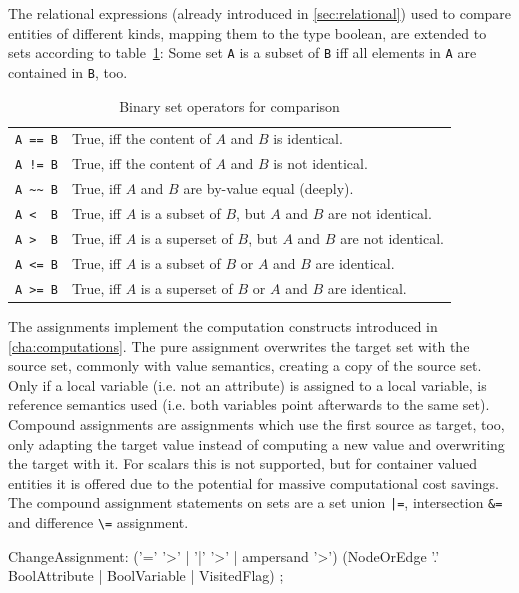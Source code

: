 The relational expressions (already introduced in \ref{sec:relational}) used to compare entities of different kinds, mapping them to the type boolean, are extended to sets according to table~\ref{compset}:
Some set \texttt{A} is a subset of \texttt{B} iff all elements in \texttt{A} are contained in \texttt{B}, too.

\begin{table}[htbp]
  \centering
  \begin{tabularx}{\linewidth}{|l|X|}
    \hline
    \texttt{A == B} & True, iff the content of $A$ and $B$ is identical. \\
    \texttt{A != B} & True, iff the content of $A$ and $B$ is not identical. \\
    \texttt{A \textasciitilde\textasciitilde\ B} & True, iff $A$ and $B$ are by-value equal (deeply).\\
    \texttt{A <\ \ B} & True, iff $A$ is a subset of $B$, but $A$ and $B$ are not identical. \\
    \texttt{A >\ \ B} & True, iff $A$ is a superset of $B$, but $A$ and $B$ are not identical. \\
    \texttt{A <= B} & True, iff $A$ is a subset of $B$ or $A$ and $B$ are identical. \\
    \texttt{A >= B} & True, iff $A$ is a superset of $B$ or $A$ and $B$ are identical. \\
    \hline
  \end{tabularx}
  \caption{Binary set operators for comparison}
  \label{compset}
\end{table}

The assignments implement the computation constructs introduced in \ref{cha:computations}.
The pure assignment overwrites the target set with the source set, commonly with value semantics, creating a copy of the source set. Only if a local variable (i.e. not an attribute) is assigned to a local variable, is reference semantics used (i.e. both variables point afterwards to the same set).
Compound assignments are assignments which use the first source as target, too,
only adapting the target value instead of computing a new value and overwriting the target with it.
For scalars this is not supported, but for container valued entities it is offered due to the potential for massive computational cost savings.
The compound assignment statements on sets are a set union \verb#|=#, intersection \verb#&=# and difference \verb#\=# assignment.

\begin{rail}
  ChangeAssignment: ('=' '>' | '|' '>' | ampersand '>') (NodeOrEdge '.' BoolAttribute | BoolVariable | VisitedFlag) ;
\end{rail}

